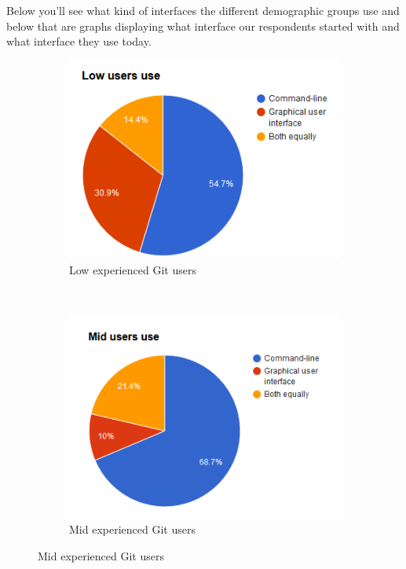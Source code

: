 \documentclass[a4paper,oneside]{bth} %
\begin{document}
			Below you'll see what kind of interfaces the different demographic groups use and below that are graphs displaying what interface our respondents started with and what interface they use today.
			\begin{figure}[H]
					\centering
					\begin{subfigure}[b]{0.315\textwidth}
						\includegraphics[width=\textwidth]{graphs/low-users-use.png}
						\caption{Low experienced Git users}
						\label{fig:Low users use}
					\end{subfigure}
					~
					\begin{subfigure}[b]{0.315\textwidth}
						\includegraphics[width=\textwidth]{graphs/mid-users-use.png}
						\caption{Mid experienced Git users}

\end{subfigure}
\end{figure}
\end{document}

